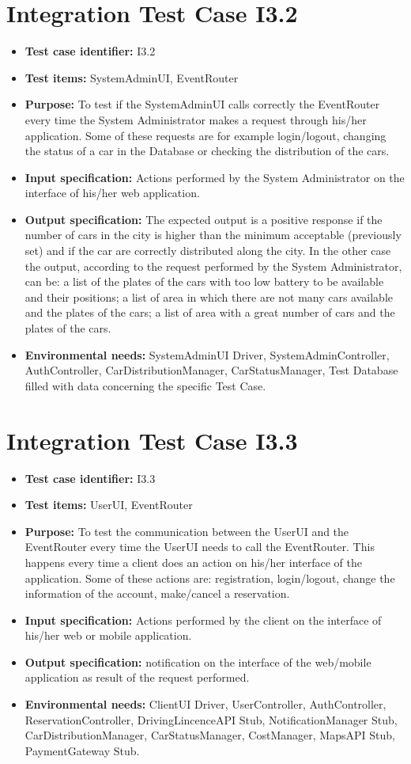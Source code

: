 \section{Integration Test Case I3.2}
\begin{itemize}
\item \textbf{Test case identifier:} I3.2
\item \textbf{Test items:} SystemAdminUI, EventRouter
\item \textbf{Purpose:} To test if the SystemAdminUI calls correctly the EventRouter every time the System Administrator makes a request through his/her application. Some of these requests are for example login/logout, changing the status of a car in the Database or checking the distribution of the cars.
\item \textbf{Input specification:} Actions performed by the System Administrator on the interface of his/her web application.
\item \textbf{Output specification:} The expected output is a positive response if the number of cars in the city is higher than the minimum acceptable (previously set) and if the car are correctly distributed along the city. In the other case the output, according to the request performed by the System Administrator, can be: a list of the plates of the cars with too low battery to be available and their positions; a list of area in which there are not many cars available and the plates of the cars; a list of area with a great number of cars and the plates of the cars.
\item \textbf{Environmental needs:} SystemAdminUI Driver, SystemAdminController, AuthController, CarDistributionManager, CarStatusManager, Test Database filled with data concerning the specific Test Case.
\end{itemize}

\section{Integration Test Case I3.3}
\begin{itemize}
\item \textbf{Test case identifier:} I3.3
\item \textbf{Test items:} UserUI, EventRouter
\item \textbf{Purpose:} To test the communication between the UserUI and the EventRouter every time the UserUI needs to call the EventRouter. This happens every time a client does an action on his/her interface of the application. Some of these actions are: registration, login/logout, change the information of the account, make/cancel a reservation.
\item \textbf{Input specification:} Actions performed by the client on the interface of his/her web or mobile application.
\item \textbf{Output specification:} notification on the interface of the web/mobile application as result of the request performed.
\item \textbf{Environmental needs:} ClientUI Driver,  UserController, AuthController, ReservationController, DrivingLincenceAPI Stub, NotificationManager Stub, CarDistributionManager, CarStatusManager, CostManager, MapsAPI Stub, PaymentGateway Stub.
\end{itemize}